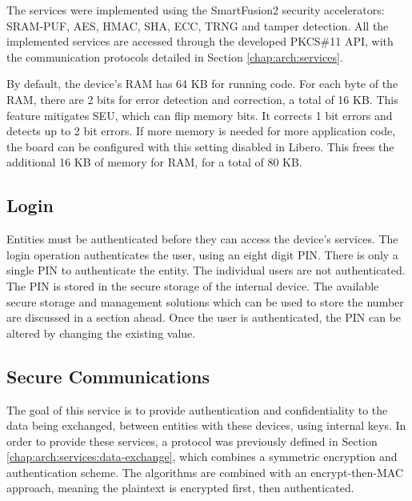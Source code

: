 The services were implemented using the SmartFusion2 security accelerators: SRAM-PUF, AES, HMAC, SHA, ECC, TRNG and tamper detection.
All the implemented services are accessed through the developed PKCS\#11 API, with the communication protocols detailed in Section \ref{chap:arch:services}.

By default, the device's RAM has 64 KB for running code. For each byte of the \ac{RAM}, there are 2 bits for error detection and correction, a total of 16 KB. This feature mitigates \ac{SEU}, which can flip memory bits. It corrects 1 bit errors and detects up to 2 bit errors. If more memory is needed for more application code, the board can be configured with this setting disabled in Libero. This frees the additional 16 KB of memory for RAM, for a total of 80 KB.

\subsection{Login}\label{chap:implementation:services:authentication}

Entities must be authenticated before they can access the device's services. The login operation authenticates the user, using an eight digit PIN.
There is only a single PIN to authenticate the entity. The individual users are not authenticated.
The PIN is stored in the secure storage of the internal device. The available secure storage and management solutions which can be used to store the number are discussed in a section ahead.
Once the user is authenticated, the PIN can be altered by changing the existing value.

\subsection{Secure Communications}\label{chap:implementation:services:secure}

The goal of this service is to provide authentication and confidentiality to the data being exchanged, between entities with these devices, using internal keys.
In order to provide these services, a protocol was previously defined in Section \ref{chap:arch:services:data-exchange}, which combines a symmetric encryption and authentication scheme. The algorithms are combined with an encrypt-then-MAC approach, meaning the plaintext is encrypted first, then authenticated.

